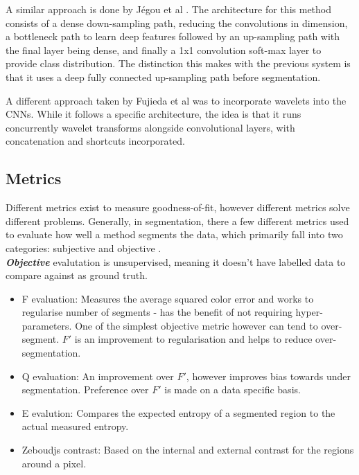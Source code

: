 \documentclass[a4]{article}
\begin{document}
A similar approach is done by J{\'e}gou et al \cite{jegou2017one}. The architecture for this method consists of a dense down-sampling path, reducing the convolutions in dimension, a bottleneck path to learn deep features followed by an up-sampling path with the final layer being dense, and finally a 1x1 convolution soft-max layer to provide class distribution. The distinction this makes with the previous system is that it uses a deep fully connected up-sampling path before segmentation. 

  

A different approach taken by Fujieda et al \cite{fujieda2018wavelet} was to incorporate wavelets into the CNNs. While it follows a specific architecture, the idea is that it runs concurrently wavelet transforms alongside convolutional layers, with concatenation and shortcuts incorporated. 


\subsection*{Metrics}

Different metrics exist to measure goodness-of-fit, however different metrics solve different problems. Generally, in segmentation, there a few different metrics used to evaluate how well a method segments the data, which primarily fall into two categories: subjective and objective \cite{garcia2018segmentation}.\\

\textbf{\textit{Objective}} evalutation is unsupervised, meaning it doesn't have labelled data to compare against as ground truth.

\begin{itemize}
\item F evaluation: Measures the average squared color error and works to regularise number of segments - has the benefit of not requiring hyper-parameters. One of the simplest objective metric however can tend to over-segment. $F'$ is an improvement to  regularisation and helps to reduce over-segmentation.
\item Q evaluation: An improvement over $F'$, however improves bias towards under segmentation. Preference over $F'$ is made on a data specific basis.
\item E evalution: Compares the expected entropy of a segmented region to the actual measured entropy.
\item Zeboudjs contrast: Based on the internal and external contrast for the regions around a pixel.
\end{itemize}
\end{document}
